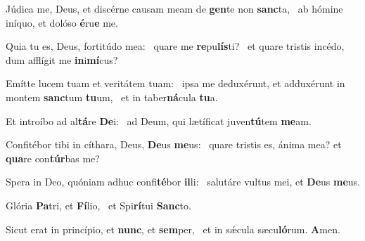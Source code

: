 \item Júdica me, Deus, et discérne causam meam de \textbf{gen}te non \textbf{sanc}ta,~\psstar{} ab hómine iníquo, et dolóso \textbf{é}ru\textbf{e} me.
\item Quia tu es, Deus, fortitúdo mea:~\pscross{} quare me \textbf{re}pu\textbf{lís}ti?~\psstar{} et quare tristis incédo, dum afflígit me \textbf{in}i\textbf{mí}cus?
\item Emítte lucem tuam et veritátem tuam:~\pscross{} ipsa me deduxérunt, et adduxérunt in montem \textbf{sanc}tum \textbf{tu}um,~\psstar{} et in taber\textbf{ná}cula \textbf{tu}a.
\item Et introíbo ad al\textbf{tá}re \textbf{De}i:~\psstar{} ad Deum, qui lætíficat juven\textbf{tú}tem \textbf{me}am.
\item Confitébor tibi in cíthara, Deus, \textbf{De}us \textbf{me}us:~\psstar{} quare tristis es, ánima mea? et \textbf{qua}re con\textbf{túr}bas me?
\item Spera in Deo, quóniam adhuc confi\textbf{té}bor \textbf{il}li:~\psstar{} salutáre vultus mei, et \textbf{De}us \textbf{me}us.
\item Glória \textbf{Pa}tri, et \textbf{Fí}lio,~\psstar{} et Spi\textbf{rí}tui \textbf{Sanc}to.
\item Sicut erat in princípio, et \textbf{nunc}, et \textbf{sem}per,~\psstar{} et in sǽcula sæcu\textbf{ló}rum. \textbf{A}men.
